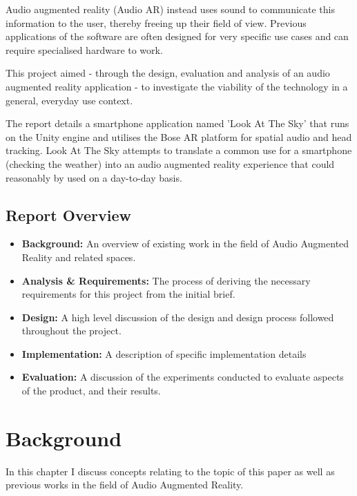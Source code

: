 \documentclass{l4proj}
\begin{document}
Audio augmented reality (Audio AR) instead uses sound to communicate this information to the user, thereby freeing up their field of view.  Previous applications of the software are often designed for very specific use cases and can require specialised hardware to work.

This project aimed - through the design, evaluation and analysis of an audio augmented reality application - to investigate the viability of the technology in a general, everyday use context.

The report details a smartphone application named 'Look At The Sky' that runs on the Unity engine and utilises the Bose AR platform for spatial audio and head tracking. Look At The Sky attempts to translate a common use for a smartphone (checking the weather) into an audio augmented reality experience that could reasonably by used on a day-to-day basis.

\section{Report Overview}
\begin{itemize}
    \item \textbf{Background: }An overview of existing work in the field of Audio Augmented Reality and related spaces.
    \item \textbf{Analysis \& Requirements: }The process of deriving the necessary requirements for this project from the initial brief.
    \item \textbf{Design: }A high level discussion of the design and design process followed throughout the project.
    \item \textbf{Implementation: }A description of specific implementation details
    \item \textbf{Evaluation: }A discussion of the experiments conducted to evaluate aspects of the product, and their results.
\end{itemize}


\chapter{Background}
In this chapter I discuss concepts relating to the topic of this paper as well as previous works in the field of Audio Augmented Reality.
\end{document}
